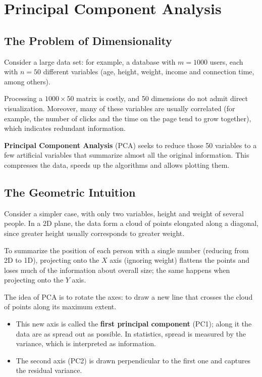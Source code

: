 \documentclass[11pt, a4paper]{article}
\begin{document}
\newpage

\section{Principal Component Analysis}

\subsection{The Problem of Dimensionality}

Consider a large data set: for example, a database with $m = 1000$ users, each with $n = 50$ different variables (age, height, weight, income and connection time, among others).

Processing a $1000 \times 50$ matrix is costly, and 50 dimensions do not admit direct visualization. Moreover, many of these variables are usually correlated (for example, the number of clicks and the time on the page tend to grow together), which indicates redundant information.

\textbf{Principal Component Analysis} (PCA) seeks to reduce those 50 variables to a few artificial variables that summarize almost all the original information. This compresses the data, speeds up the algorithms and allows plotting them.

\subsection{The Geometric Intuition}

Consider a simpler case, with only two variables, height and weight of several people. In a 2D plane, the data form a cloud of points elongated along a diagonal, since greater height usually corresponds to greater weight.

To summarize the position of each person with a single number (reducing from 2D to 1D), projecting onto the $X$ axis (ignoring weight) flattens the points and loses much of the information about overall size; the same happens when projecting onto the $Y$ axis.

The idea of PCA is to rotate the axes: to draw a new line that crosses the cloud of points along its maximum extent.
\begin{itemize}
    \item This new axis is called the \textbf{first principal component} (PC1); along it the data are as spread out as possible. In statistics, spread is measured by the variance, which is interpreted as information.
    \item The second axis (PC2) is drawn perpendicular to the first one and captures the residual variance.
\end{itemize}
\end{document}
